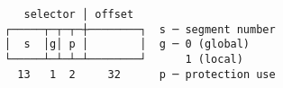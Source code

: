 \documentclass[varwidth=30em]{standalone}
\begin{document}
\begin{verbatim}
   selector │ offset
┌─────┬─┬─┬─┼────────┐  s ─ segment number
│  s  │g│ p │        │  g ─ 0 (global)
└─────┴─┴─┴─┴────────┘      1 (local)
  13   1  2     32      p ─ protection use
\end{verbatim}
\end{document}
